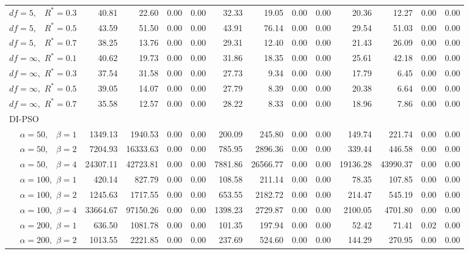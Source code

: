 \documentclass[12pt]{article}
\begin{document}
\begin{appendix}
\begin{table}[ht]
{\begin{tabular}{r|rrrr|rrrr|rrrr}
  $df = 5,\enspace$ $R^* =0.3$ & 40.81 & 22.60 & 0.00 & 0.00 & 32.33 & 19.05 & 0.00 & 0.00 & 20.36 & 12.27 & 0.00 & 0.00 \\ 
  $df = 5,\enspace$ $R^* =0.5$ & 43.59 & 51.50 & 0.00 & 0.00 & 43.91 & 76.14 & 0.00 & 0.00 & 29.54 & 51.03 & 0.00 & 0.00 \\ 
  $df = 5,\enspace$ $R^* =0.7$ & 38.25 & 13.76 & 0.00 & 0.00 & 29.31 & 12.40 & 0.00 & 0.00 & 21.43 & 26.09 & 0.00 & 0.00 \\ 
  $df = \infty,$ $R^* =0.1$ & 40.62 & 19.73 & 0.00 & 0.00 & 31.86 & 18.35 & 0.00 & 0.00 & 25.61 & 42.18 & 0.00 & 0.00 \\ 
  $df = \infty,$ $R^* =0.3$ & 37.54 & 31.58 & 0.00 & 0.00 & 27.73 & 9.34 & 0.00 & 0.00 & 17.79 & 6.45 & 0.00 & 0.00 \\ 
  $df = \infty,$ $R^* =0.5$ & 39.05 & 14.07 & 0.00 & 0.00 & 27.79 & 8.39 & 0.00 & 0.00 & 20.38 & 6.64 & 0.00 & 0.00 \\ 
  $df = \infty,$ $R^* =0.7$ & 35.58 & 12.57 & 0.00 & 0.00 & 28.22 & 8.33 & 0.00 & 0.00 & 18.96 & 7.86 & 0.00 & 0.00 \\ 
\hline
\multicolumn{1}{l|}{DI-PSO} &&&&&&&&&&&&\\
  $\alpha = 50,\enspace$ $\beta =1$ & 1349.13 & 1940.53 & 0.00 & 0.00 & 200.09 & 245.80 & 0.00 & 0.00 & 149.74 & 221.74 & 0.00 & 0.00 \\ 
  $\alpha = 50,\enspace$ $\beta =2$ & 7204.93 & 16333.63 & 0.00 & 0.00 & 785.95 & 2896.36 & 0.00 & 0.00 & 339.44 & 446.58 & 0.00 & 0.00 \\ 
  $\alpha = 50,\enspace$ $\beta =4$ & 24307.11 & 42723.81 & 0.00 & 0.00 & 7881.86 & 26566.77 & 0.00 & 0.00 & 19136.28 & 43990.37 & 0.00 & 0.00 \\ 
  $\alpha = 100,$ $\beta =1$ & 420.14 & 827.79 & 0.00 & 0.00 & 108.58 & 211.14 & 0.00 & 0.00 & 78.35 & 107.85 & 0.00 & 0.00 \\ 
  $\alpha = 100,$ $\beta =2$ & 1245.63 & 1717.55 & 0.00 & 0.00 & 653.55 & 2182.72 & 0.00 & 0.00 & 214.47 & 545.19 & 0.00 & 0.00 \\ 
  $\alpha = 100,$ $\beta =4$ & 33664.67 & 97150.26 & 0.00 & 0.00 & 1398.23 & 2729.87 & 0.00 & 0.00 & 2100.05 & 4701.80 & 0.00 & 0.00 \\ 
  $\alpha = 200,$ $\beta =1$ & 636.50 & 1081.78 & 0.00 & 0.00 & 101.35 & 197.94 & 0.00 & 0.00 & 52.42 & 71.41 & 0.02 & 0.00 \\ 
  $\alpha = 200,$ $\beta =2$ & 1013.55 & 2221.85 & 0.00 & 0.00 & 237.69 & 524.60 & 0.00 & 0.00 & 144.29 & 270.95 & 0.00 & 0.00 \\ 

\end{tabular}}
\end{table}
\end{appendix}
\end{document}
